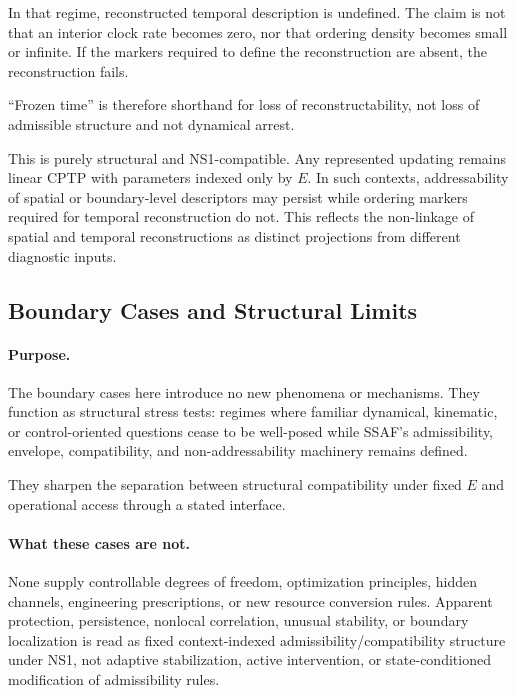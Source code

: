 \documentclass[aps,prx,onecolumn,11pt]{revtex4-2}
\theoremstyle{plain}
\theoremstyle{definition}
\theoremstyle{remark}
\begin{document}
In that regime, reconstructed temporal description is undefined. The
claim is not that an interior clock rate becomes zero, nor that
ordering density becomes small or infinite. If the markers required to
define the reconstruction are absent, the reconstruction fails.

``Frozen time'' is therefore shorthand for loss of reconstructability,
not loss of admissible structure and not dynamical arrest.

This is purely structural and NS1-compatible. Any represented updating
remains linear CPTP with parameters indexed only by \(E\). In such
contexts, addressability of spatial or boundary-level descriptors may
persist while ordering markers required for temporal reconstruction do
not. This reflects the non-linkage of spatial and temporal
reconstructions as distinct projections from different diagnostic
inputs.

\subsection{Boundary Cases and Structural Limits}
\label{appG:boundary_cases_intro}

\paragraph{Purpose.}

The boundary cases here introduce no new phenomena or mechanisms. They
function as structural stress tests: regimes where familiar dynamical,
kinematic, or control-oriented questions cease to be well-posed while
SSAF's admissibility, envelope, compatibility, and non-addressability
machinery remains defined.

They sharpen the separation between structural compatibility under
fixed \(E\) and operational access through a stated interface.

\paragraph{What these cases are not.}

None supply controllable degrees of freedom, optimization principles,
hidden channels, engineering prescriptions, or new resource
conversion rules. Apparent protection, persistence, nonlocal
correlation, unusual stability, or boundary localization is read as
fixed context-indexed admissibility/compatibility structure under NS1,
not adaptive stabilization, active intervention, or state-conditioned
modification of admissibility rules.
\end{document}
